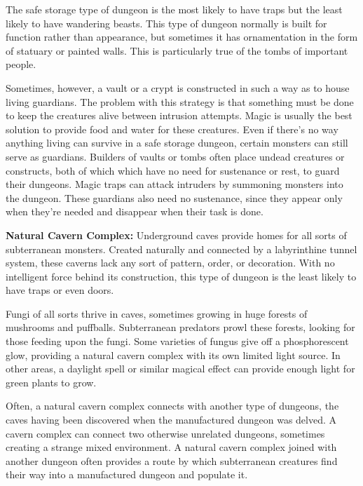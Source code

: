 The safe storage type of dungeon is the most likely to have traps but the least likely to have wandering beasts. This type of dungeon normally is built for function rather than appearance, but sometimes it has ornamentation in the form of statuary or painted walls. This is particularly true of the tombs of important people.

Sometimes, however, a vault or a crypt is constructed in such a way as to house living guardians. The problem with this strategy is that something must be done to keep the creatures alive between intrusion attempts. Magic is usually the best solution to provide food and water for these creatures. Even if there's no way anything living can survive in a safe storage dungeon, certain monsters can still serve as guardians. Builders of vaults or tombs often place undead creatures or constructs, both of which which have no need for sustenance or rest, to guard their dungeons. Magic traps can attack intruders by summoning monsters into the dungeon. These guardians also need no sustenance, since they appear only when they're needed and disappear when their task is done.

\textbf{Natural Cavern Complex:} Underground caves provide homes for all sorts of subterranean monsters. Created naturally and connected by a labyrinthine tunnel system, these caverns lack any sort of pattern, order, or decoration. With no intelligent force behind its construction, this type of dungeon is the least likely to have traps or even doors.

Fungi of all sorts thrive in caves, sometimes growing in huge forests of mushrooms and puffballs. Subterranean predators prowl these forests, looking for those feeding upon the fungi. Some varieties of fungus give off a phosphorescent glow, providing a natural cavern complex with its own limited light source. In other areas, a daylight spell or similar magical effect can provide enough light for green plants to grow.

Often, a natural cavern complex connects with another type of dungeons, the caves having been discovered when the manufactured dungeon was delved. A cavern complex can connect two otherwise unrelated dungeons, sometimes creating a strange mixed environment. A natural cavern complex joined with another dungeon often provides a route by which subterranean creatures find their way into a manufactured dungeon and populate it.


